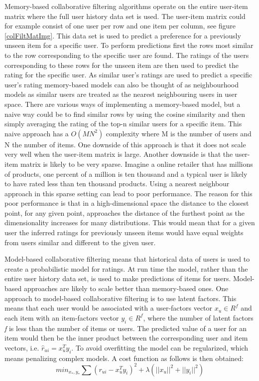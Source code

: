 \documentclass[a4paper,11pt]{kth-mag}
\begin{document}
Memory-based collaborative filtering algorithms operate on the entire user-item matrix where the full user history data set is used\cite{breese1998empirical}. The user-item matrix could for example consist of one user per row and one item per column, see figure \ref{colFiltMatImg}. This data set is used to predict a preference for a previously unseen item for a specific user. To perform predictions first the rows most similar to the row corresponding to the specific user are found. The ratings of the users corresponding to these rows for the unseen item are then used to predict the rating for the specific user. As similar user's ratings are used to predict a specific user's rating memory-based models can also be thought of as neighbourhood models as similar users are treated as the nearest neighbouring users in user space\cite{hu2008collaborative}. There are various ways of implementing a memory-based model, but a naive way could be to find similar rows by using the cosine similarity and then simply averaging the rating of the top-n similar users for a specific item. This naive approach has a $O(MN^2)$ complexity where M is the number of users and N the number of items. One downside of this approach is that it does not scale very well when the user-item matrix is large. Another downside is that the user-item matrix is likely to be very sparse. Imagine a online retailer that has millions of products, one percent of a million is ten thousand and a typical user is likely to have rated less than ten thousand products. Using a nearest neighbour approach in this sparse setting can lead to poor performance\cite{sarwar2001item}\cite{su2009survey}. The reason for this poor performance is that in a high-dimensional space the distance to the closest point, for any given point, approaches the distance of the furthest point as the dimensionality increases for many distributions\cite{beyer1999nearest}. This would mean that for a given user the inferred ratings for previously unseen items would have equal weights from users similar and different to the given user.

Model-based collaborative filtering means that historical data of users is used to create a probabilistic model for ratings. At run time the model, rather than the entire user history data set, is used to make predictions of items for users\cite{breese1998empirical}. Model-based approaches are likely to scale better than memory-based ones\cite{sarwar2001item}. One approach to model-based collaborative filtering is to use latent factors. This means that each user would be associated with a user-factors vector $x_u \in R^f$ and each item with an item-factors vector $y_i \in R^f$, where the number of latent factors \textit{f} is less than the number of items or users. The predicted value of a user for an item would then be the inner product between the corresponding user and item vectors, i.e. $\hat{r}_{ui} = x_u^T y_i$. To avoid overfitting the model can be regularized, which means penalizing complex models. A cost function as follows is then obtained: 
\begin{equation}
min_{x_*,y_*} \sum (r_{ui} - x_u^Ty_i)^2 +  \lambda(||x_u||^2 + ||y_i||^2)
\label{corFilt1}
\end{equation}
\end{document}
